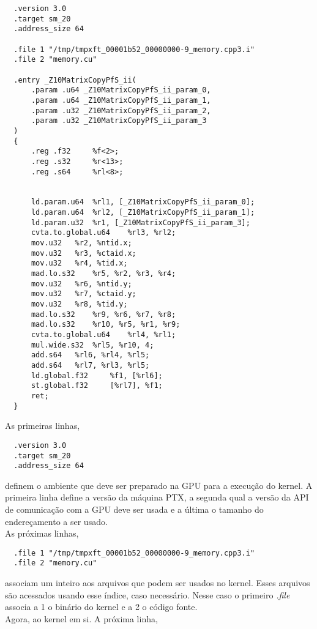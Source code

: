 \begin{lstlisting}
  .version 3.0
  .target sm_20
  .address_size 64

  .file	1 "/tmp/tmpxft_00001b52_00000000-9_memory.cpp3.i"
  .file	2 "memory.cu"

  .entry _Z10MatrixCopyPfS_ii(
	  .param .u64 _Z10MatrixCopyPfS_ii_param_0,
	  .param .u64 _Z10MatrixCopyPfS_ii_param_1,
	  .param .u32 _Z10MatrixCopyPfS_ii_param_2,
	  .param .u32 _Z10MatrixCopyPfS_ii_param_3
  )
  {
	  .reg .f32 	%f<2>;
	  .reg .s32 	%r<13>;
	  .reg .s64 	%rl<8>;


	  ld.param.u64 	%rl1, [_Z10MatrixCopyPfS_ii_param_0];
	  ld.param.u64 	%rl2, [_Z10MatrixCopyPfS_ii_param_1];
	  ld.param.u32 	%r1, [_Z10MatrixCopyPfS_ii_param_3];
	  cvta.to.global.u64 	%rl3, %rl2;
	  mov.u32 	%r2, %ntid.x;
	  mov.u32 	%r3, %ctaid.x;
	  mov.u32 	%r4, %tid.x;
	  mad.lo.s32 	%r5, %r2, %r3, %r4;
	  mov.u32 	%r6, %ntid.y;
	  mov.u32 	%r7, %ctaid.y;
	  mov.u32 	%r8, %tid.y;
	  mad.lo.s32 	%r9, %r6, %r7, %r8;
	  mad.lo.s32 	%r10, %r5, %r1, %r9;
	  cvta.to.global.u64 	%rl4, %rl1;
	  mul.wide.s32 	%rl5, %r10, 4;
	  add.s64 	%rl6, %rl4, %rl5;
	  add.s64 	%rl7, %rl3, %rl5;
	  ld.global.f32 	%f1, [%rl6];
	  st.global.f32 	[%rl7], %f1;
	  ret;
  }
\end{lstlisting}

As primeiras linhas,

\begin{lstlisting}
  .version 3.0
  .target sm_20
  .address_size 64
\end{lstlisting}

definem o ambiente que deve ser preparado na GPU para a execução do kernel. A primeira linha define a versão da máquina PTX, a segunda
qual a versão da API de comunicação com a GPU deve ser usada e a última o tamanho do endereçamento a ser usado. \\
As próximas linhas, 

\begin{lstlisting}
  .file	1 "/tmp/tmpxft_00001b52_00000000-9_memory.cpp3.i"
  .file	2 "memory.cu"
\end{lstlisting}

associam um inteiro aos arquivos que podem ser usados no kernel. Esses arquivos são acessados usando esse índice, caso necessário.
Nesse caso o primeiro \textit{.file} associa a 1 o binário do kernel e a 2 o código fonte.\\

Agora, ao kernel em si. A próxima linha,

